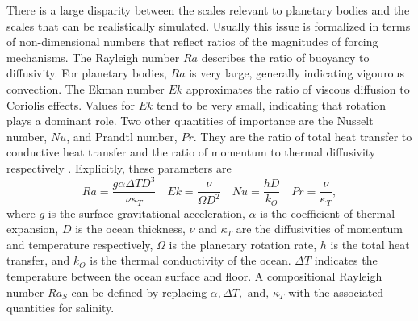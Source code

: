 \documentclass{article}
\begin{document}
There is a large disparity between the scales relevant to planetary bodies and the scales that can be realistically simulated.
Usually this issue is formalized in terms of non-dimensional numbers that reflect ratios of the magnitudes of forcing mechanisms. %
The Rayleigh number $Ra$ describes the ratio of buoyancy to diffusivity. For planetary bodies, $Ra$ is very large, generally indicating vigourous convection.
The Ekman number $Ek$ approximates the ratio of viscous diffusion to Coriolis effects. Values for $Ek$ tend to be very small, indicating that rotation plays a dominant role.
Two other quantities of importance are the Nusselt number, $Nu$, and Prandtl number, $Pr$. 
They are the ratio of total heat transfer to conductive heat transfer and the ratio of momentum to thermal diffusivity respectively \citep{kS19}. 
Explicitly, these parameters are
\[Ra = \frac{g\alpha\Delta T D^{3}}{\nu\kappa_{T}}\quad Ek = \frac{\nu}{\Omega D^{2}} \quad Nu = \frac{hD}{k_{O}} \quad Pr= \frac{\nu}{\kappa_{T}},\]
where $g$ is the surface gravitational acceleration, $\alpha$ is the coefficient of thermal expansion, $D$ is the ocean thickness, $\nu$ and $\kappa_T$ are the diffusivities of momentum and temperature respectively, $\Omega$ is the planetary rotation rate, $h$ is the total heat transfer, and $k_O$ is the thermal conductivity of the ocean. $\Delta T$ indicates the temperature between the ocean surface and floor. 
A compositional Rayleigh number $Ra_{S}$ can be defined by replacing $\alpha, \Delta T,\text{ and, }\kappa_{T}$ with the associated quantities for salinity.
\end{document}
